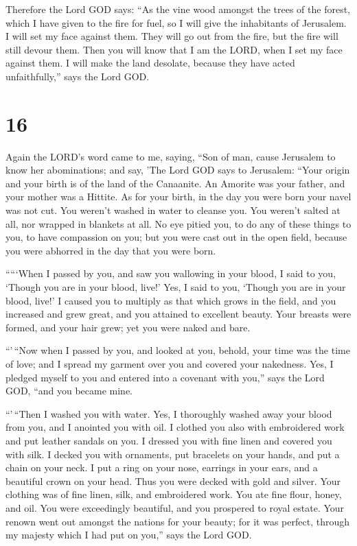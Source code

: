  Therefore the Lord GOD says: ``As the vine wood amongst
the trees of the forest, which I have given to the fire for fuel, so I
will give the inhabitants of Jerusalem.  I will set my
face against them. They will go out from the fire, but the fire will
still devour them. Then you will know that I am the LORD, when I set my
face against them.  I will make the land desolate, because
they have acted unfaithfully,'' says the Lord GOD.

\hypertarget{section-14}{%
\section{16}\label{section-14}}

 Again the LORD's word came to me, saying, 
``Son of man, cause Jerusalem to know her abominations; 
and say, 'The Lord GOD says to Jerusalem: ``Your origin and your birth
is of the land of the Canaanite. An Amorite was your father, and your
mother was a Hittite.  As for your birth, in the day you
were born your navel was not cut. You weren't washed in water to cleanse
you. You weren't salted at all, nor wrapped in blankets at all.
 No eye pitied you, to do any of these things to you, to
have compassion on you; but you were cast out in the open field, because
you were abhorred in the day that you were born.

 `````When I passed by you, and saw you wallowing in your
blood, I said to you, `Though you are in your blood, live!' Yes, I said
to you, `Though you are in your blood, live!'  I caused
you to multiply as that which grows in the field, and you increased and
grew great, and you attained to excellent beauty. Your breasts were
formed, and your hair grew; yet you were naked and bare.

 ``'\,``Now when I passed by you, and looked at you,
behold, your time was the time of love; and I spread my garment over you
and covered your nakedness. Yes, I pledged myself to you and entered
into a covenant with you,'' says the Lord GOD, ``and you became mine.

 ``'\,``Then I washed you with water. Yes, I thoroughly
washed away your blood from you, and I anointed you with oil.
 I clothed you also with embroidered work and put leather
sandals on you. I dressed you with fine linen and covered you with silk.
 I decked you with ornaments, put bracelets on your
hands, and put a chain on your neck.  I put a ring on
your nose, earrings in your ears, and a beautiful crown on your head.
 Thus you were decked with gold and silver. Your clothing
was of fine linen, silk, and embroidered work. You ate fine flour,
honey, and oil. You were exceedingly beautiful, and you prospered to
royal estate.  Your renown went out amongst the nations
for your beauty; for it was perfect, through my majesty which I had put
on you,'' says the Lord GOD.

